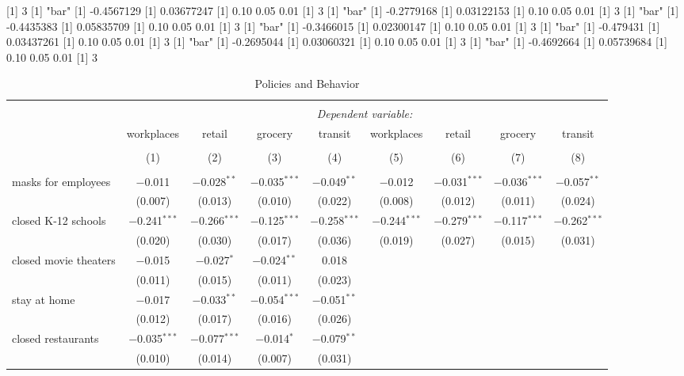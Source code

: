 [1] 3
[1] "bar"
[1] -0.4567129
[1] 0.03677247
[1] 0.10 0.05 0.01
[1] 3
[1] "bar"
[1] -0.2779168
[1] 0.03122153
[1] 0.10 0.05 0.01
[1] 3
[1] "bar"
[1] -0.4435383
[1] 0.05835709
[1] 0.10 0.05 0.01
[1] 3
[1] "bar"
[1] -0.3466015
[1] 0.02300147
[1] 0.10 0.05 0.01
[1] 3
[1] "bar"
[1] -0.479431
[1] 0.03437261
[1] 0.10 0.05 0.01
[1] 3
[1] "bar"
[1] -0.2695044
[1] 0.03060321
[1] 0.10 0.05 0.01
[1] 3
[1] "bar"
[1] -0.4692664
[1] 0.05739684
[1] 0.10 0.05 0.01
[1] 3

\begin{table}[!htbp] \centering 
  \caption{Policies and Behavior} 
  \label{} 
\begin{tabular}{@{\extracolsep{1pt}}lcccccccc} 
\\[-1.8ex]\hline 
\hline \\[-1.8ex] 
 & \multicolumn{8}{c}{\textit{Dependent variable:}} \\ 
\cline{2-9} 
 & workplaces & retail & grocery & transit & workplaces & retail & grocery & transit \\ 
\\[-1.8ex] & (1) & (2) & (3) & (4) & (5) & (6) & (7) & (8)\\ 
\hline \\[-1.8ex] 
 masks for employees & $-$0.011 & $-$0.028$^{**}$ & $-$0.035$^{***}$ & $-$0.049$^{**}$ & $-$0.012 & $-$0.031$^{***}$ & $-$0.036$^{***}$ & $-$0.057$^{**}$ \\ 
  & (0.007) & (0.013) & (0.010) & (0.022) & (0.008) & (0.012) & (0.011) & (0.024) \\ 
  closed K-12 schools & $-$0.241$^{***}$ & $-$0.266$^{***}$ & $-$0.125$^{***}$ & $-$0.258$^{***}$ & $-$0.244$^{***}$ & $-$0.279$^{***}$ & $-$0.117$^{***}$ & $-$0.262$^{***}$ \\ 
  & (0.020) & (0.030) & (0.017) & (0.036) & (0.019) & (0.027) & (0.015) & (0.031) \\ 
  closed movie theaters & $-$0.015 & $-$0.027$^{*}$ & $-$0.024$^{**}$ & 0.018 &  &  &  &  \\ 
  & (0.011) & (0.015) & (0.011) & (0.023) &  &  &  &  \\ 
  stay at home & $-$0.017 & $-$0.033$^{**}$ & $-$0.054$^{***}$ & $-$0.051$^{**}$ &  &  &  &  \\ 
  & (0.012) & (0.017) & (0.016) & (0.026) &  &  &  &  \\ 
  closed restaurants & $-$0.035$^{***}$ & $-$0.077$^{***}$ & $-$0.014$^{*}$ & $-$0.079$^{**}$ &  &  &  &  \\ 
  & (0.010) & (0.014) & (0.007) & (0.031) &  &  &  &  \\ 

\end{tabular}
\end{table}
